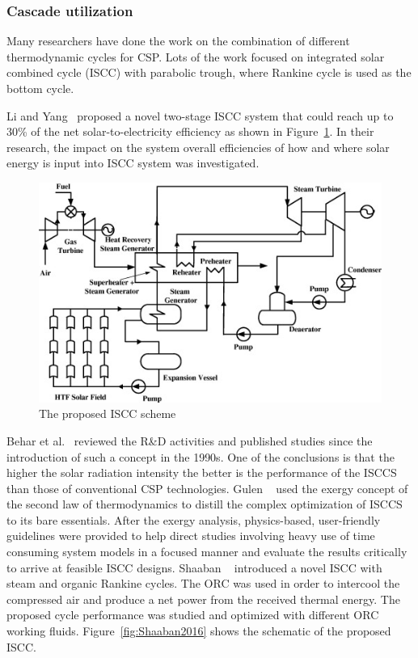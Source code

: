 \subsubsection{Cascade utilization}


Many researchers have done the work on the combination of different thermodynamic cycles for CSP. Lots of the work focused on integrated solar combined cycle (ISCC) with parabolic trough, where Rankine cycle is used as the bottom cycle.

Li and Yang~\cite{Li2014} proposed a novel two-stage ISCC system that could reach up to 30\% of the net solar-to-electricity efficiency as shown in Figure~\ref{fig:Li2014}. In their research, the impact on the system overall efficiencies of how and where solar energy is input into ISCC system was investigated.
\begin{figure}[!ht]
\centering
\includegraphics[width=.8\textwidth]{fig/Li2014.jpg}
\caption{The proposed ISCC scheme}\label{fig:Li2014}
\end{figure}
Behar et al.~\cite{Behar2014} reviewed the R\&D activities and published studies since the introduction of such a concept in the 1990s. One of the conclusions is that the higher the solar radiation intensity the better is the performance of the ISCCS than those of conventional CSP technologies.
Gulen ~\cite{Gulen2015} used the exergy concept of the second law of thermodynamics to distill the complex optimization of ISCCS to its bare essentials. After the exergy analysis, physics-based, user-friendly guidelines were provided to help direct studies involving heavy use of time consuming system models in a focused manner and evaluate the results critically to arrive at feasible ISCC designs.
Shaaban ~\cite{Shaaban2016} introduced a novel ISCC with steam and organic Rankine cycles. The ORC was used in order to intercool the compressed air and produce a net power from the received thermal energy. The proposed cycle performance was studied and optimized with different ORC working fluids. Figure~\ref{fig:Shaaban2016} shows the schematic of the proposed ISCC.
